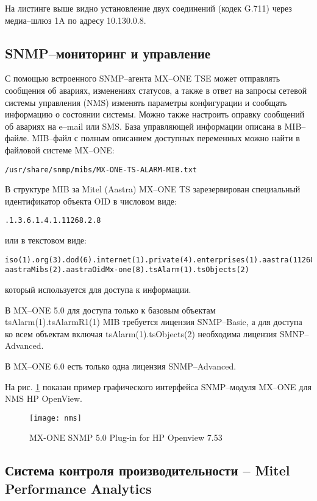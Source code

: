 На листинге выше видно установление двух соединений (кодек G.711) через медиа--шлюз 1A по адресу 10.130.0.8.

\subsection{SNMP--мониторинг и управление}

С помощью встроенного SNMP--агента MX--ONE TSE может отправлять сообщения об авариях, изменениях статусов, а также в ответ на запросы сетевой системы управления (NMS) изменять параметры конфигурации и сообщать информацию о состоянии системы. Можно также настроить оправку сообщений об авариях на e--mail или SMS. База управляющей информации описана в MIB--файле. 
MIB--файл с полным описанием доступных переменных можно найти в файловой системе MX--ONE:
\begin{lstlisting}
/usr/share/snmp/mibs/MX-ONE-TS-ALARM-MIB.txt
\end{lstlisting}

В структуре MIB за Mitel (Aastra) MX--ONE TS зарезервирован специальный идентификатор объекта OID
в числовом виде:
\begin{lstlisting}
.1.3.6.1.4.1.11268.2.8
\end{lstlisting}
или в текстовом виде:
\begin{lstlisting}
iso(1).org(3).dod(6).internet(1).private(4).enterprises(1).aastra(11268).
aastraMibs(2).aastraOidMx-one(8).tsAlarm(1).tsObjects(2)
\end{lstlisting}
который используется для доступа к информации. 

В MX--ONE 5.0 для доступа только к базовым объектам tsAlarm(1).tsAlarmR1(1) MIB требуется лицензия SNMP--Basic, а для доступа ко всем объектам включая tsAlarm(1).tsObjects(2) необходима лицензия SMNP--Advanced.

В MX--ONE 6.0 есть только одна лицензия SNMP--Advanced.

На рис. \ref{img:nms} показан пример графического интерфейса SNMP--модуля MX--ONE для NMS HP OpenView.
\begin{figure}[!ht]
  \center
  \texttt{[image: nms]}
  \caption{MX-ONE SNMP 5.0 Plug-in for HP Openview 7.53}
  \label{img:nms}
\end{figure}

\subsection{Система контроля производительности -- Mitel Performance Analytics}

